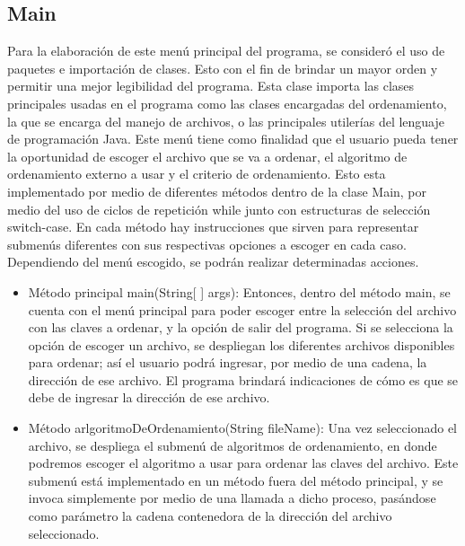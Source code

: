 \documentclass[11pt]{article}
\begin{document}
\subsection{Main}
\par
Para la elaboración de este menú principal del programa, se consideró el uso de paquetes e importación de clases. Esto con el fin de brindar un mayor orden y permitir una mejor legibilidad del programa. Esta clase importa las clases principales usadas en el programa como las clases encargadas del ordenamiento, la que se encarga del manejo de archivos, o las principales utilerías del lenguaje de programación Java. Este menú tiene como finalidad que el usuario pueda tener la oportunidad de escoger el archivo que se va a ordenar, el algoritmo de ordenamiento externo a usar y el criterio de ordenamiento. Esto esta implementado por medio de diferentes métodos dentro de la clase Main, por medio del uso de ciclos de repetición while junto con estructuras de selección switch-case. En cada método hay instrucciones que sirven para representar submenús diferentes con sus respectivas opciones a escoger en cada caso. Dependiendo del menú escogido, se podrán realizar determinadas acciones. 
\begin{itemize}
\item Método principal main(String[ ] args): Entonces, dentro del método main, se cuenta con el menú principal para poder escoger entre la selección del archivo con las claves a ordenar, y la opción de salir del programa. Si se selecciona la opción de escoger un archivo, se despliegan los diferentes archivos disponibles para ordenar; así el usuario podrá ingresar, por medio de una cadena, la dirección de ese archivo. El programa brindará indicaciones de cómo es que se debe de ingresar la dirección de ese archivo. 

\item Método arlgoritmoDeOrdenamiento(String fileName): Una vez seleccionado el archivo, se despliega el submenú de algoritmos de ordenamiento, en donde podremos escoger el algoritmo a usar para ordenar las claves del archivo. Este submenú está implementado en un método fuera del método principal, y se invoca simplemente por medio de una llamada a dicho proceso, pasándose como parámetro la cadena contenedora de la dirección del archivo seleccionado. 
\end{itemize}
\end{document}
